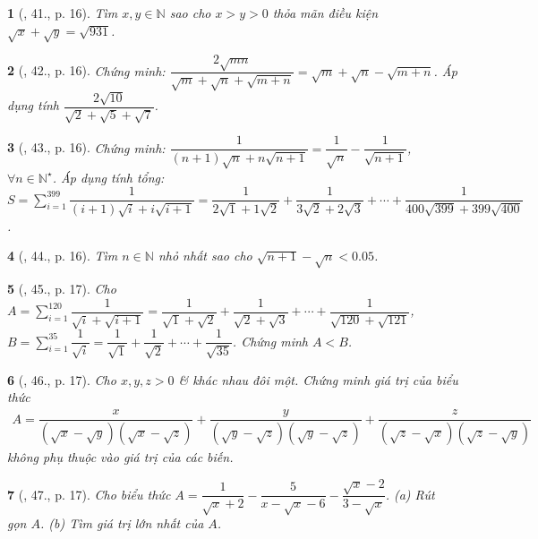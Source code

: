 \documentclass{article}
\newtheorem{baitoan}{}%
\begin{document}
\begin{baitoan}[\cite{Tuyen_Toan_9_old}, 41., p. 16]
	Tìm $x,y\in\mathbb{N}$ sao cho $x > y > 0$ thỏa mãn điều kiện $\sqrt{x} + \sqrt{y} = \sqrt{931}$.
\end{baitoan}

\begin{baitoan}[\cite{Tuyen_Toan_9_old}, 42., p. 16]
	Chứng minh: $\dfrac{2\sqrt{mn}}{\sqrt{m} + \sqrt{n} + \sqrt{m + n}} = \sqrt{m} + \sqrt{n} - \sqrt{m + n}$. Áp dụng tính $\dfrac{2\sqrt{10}}{\sqrt{2} + \sqrt{5} + \sqrt{7}}$.
\end{baitoan}

\begin{baitoan}[\cite{Tuyen_Toan_9_old}, 43., p. 16]
	Chứng minh: $\dfrac{1}{(n + 1)\sqrt{n} + n\sqrt{n + 1}} = \dfrac{1}{\sqrt{n}} - \dfrac{1}{\sqrt{n + 1}}$, $\forall n\in\mathbb{N}^\star$. Áp dụng tính tổng: $S = \sum_{i=1}^{399} \dfrac{1}{(i + 1)\sqrt{i} + i\sqrt{i + 1}} = \dfrac{1}{2\sqrt{1} + 1\sqrt{2}} + \dfrac{1}{3\sqrt{2} + 2\sqrt{3}} + \cdots + \dfrac{1}{400\sqrt{399} + 399\sqrt{400}}$.
\end{baitoan}

\begin{baitoan}[\cite{Tuyen_Toan_9_old}, 44., p. 16]
	Tìm $n\in\mathbb{N}$ nhỏ nhất sao cho $\sqrt{n + 1} - \sqrt{n} < 0.05$.
\end{baitoan}

\begin{baitoan}[\cite{Tuyen_Toan_9_old}, 45., p. 17]
	Cho $A = \sum_{i=1}^{120} \dfrac{1}{\sqrt{i} + \sqrt{i + 1}} = \dfrac{1}{\sqrt{1} + \sqrt{2}} + \dfrac{1}{\sqrt{2} + \sqrt{3}} + \cdots + \dfrac{1}{\sqrt{120} + \sqrt{121}}$, $B = \sum_{i=1}^{35} \dfrac{1}{\sqrt{i}} = \dfrac{1}{\sqrt{1}} + \dfrac{1}{\sqrt{2}} + \cdots + \dfrac{1}{\sqrt{35}}$. Chứng minh $A < B$.
\end{baitoan}

\begin{baitoan}[\cite{Tuyen_Toan_9_old}, 46., p. 17]
	Cho $x,y,z > 0$ \& khác nhau đôi một. Chứng minh giá trị của biểu thức
	\begin{align*}
		A = \dfrac{x}{(\sqrt{x} - \sqrt{y})(\sqrt{x} - \sqrt{z})} + \dfrac{y}{(\sqrt{y} - \sqrt{z})(\sqrt{y} - \sqrt{z})} + \dfrac{z}{(\sqrt{z} - \sqrt{x})(\sqrt{z} - \sqrt{y})}
	\end{align*}
	không phụ thuộc vào giá trị của các biến.
\end{baitoan}

\begin{baitoan}[\cite{Tuyen_Toan_9_old}, 47., p. 17]
	Cho biểu thức $A = \dfrac{1}{\sqrt{x} + 2} - \dfrac{5}{x - \sqrt{x} - 6} - \dfrac{\sqrt{x} - 2}{3 - \sqrt{x}}$. (a) Rút gọn $A$. (b) Tìm giá trị lớn nhất của $A$.
\end{baitoan}
\end{document}
